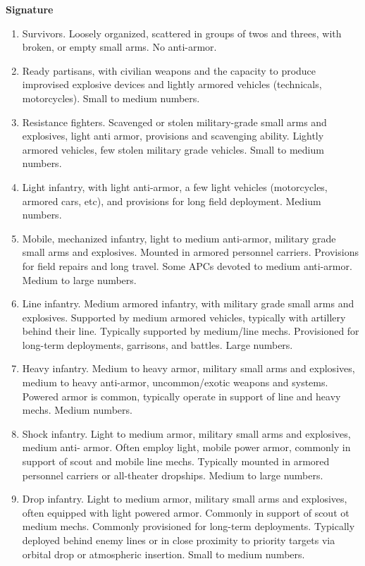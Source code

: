 \textbf{Signature}
\begin{enumerate}
    \item Survivors. Loosely organized, scattered in groups of twos and threes, with broken, or empty small arms. No anti-armor.
    \item Ready partisans, with civilian weapons and the capacity to produce improvised explosive devices and lightly armored vehicles (technicals, motorcycles). Small to medium numbers.
    \item Resistance fighters. Scavenged or stolen military-grade small arms and explosives, light anti armor, provisions and scavenging ability. Lightly armored vehicles, few stolen military grade vehicles. Small to medium numbers.
    \item Light infantry, with light anti-armor, a few light vehicles (motorcycles, armored cars, etc), and provisions for long field deployment. Medium numbers.
    \item Mobile, mechanized infantry, light to medium anti-armor, military grade small arms and explosives. Mounted in armored personnel carriers. Provisions for field repairs and long travel. Some APCs devoted to medium anti-armor. Medium to large numbers.
    \item Line infantry. Medium armored infantry, with military grade small arms and explosives. Supported by medium armored vehicles, typically with artillery behind their line. Typically supported by medium/line mechs. Provisioned for long-term deployments, garrisons, and battles. Large numbers.
    \item Heavy infantry. Medium to heavy armor, military small arms and explosives, medium to heavy anti-armor, uncommon/exotic weapons and systems. Powered armor is common, typically operate in support of line and heavy mechs. Medium numbers.
    \item Shock infantry. Light to medium armor, military small arms and explosives, medium anti- armor. Often employ light, mobile power armor, commonly in support of scout and mobile line mechs. Typically mounted in armored personnel carriers or all-theater dropships. Medium to large numbers.
    \item Drop infantry. Light to medium armor, military small arms and explosives, often equipped with light powered armor. Commonly in support of scout ot medium mechs. Commonly provisioned for long-term deployments. Typically deployed behind enemy lines or in close proximity to priority targets via orbital drop or atmospheric insertion. Small to medium numbers.

\end{enumerate}
